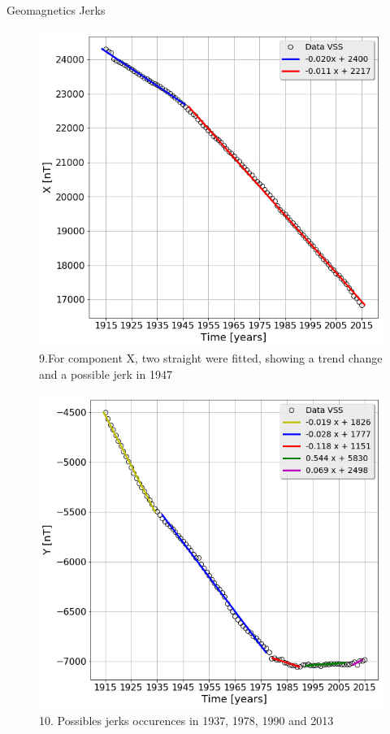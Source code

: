 \documentclass[final,t]{beamer}
\begin{document}
\begin{columns}[t]
\begin{column}{.25\linewidth}
\begin{block}{Geomagnetics Jerks}
		\centering
		\begin{figure}
			\centering
			\includegraphics[scale=0.8]{"figs_ed/Linear regression X_v3"}
			\caption{9.For component X, two straight were fitted, showing a trend change and a possible jerk in 1947}
			\label{fig:LinearregressionX_v2}
		\end{figure}
		
		
		\begin{figure}
			\centering
			\includegraphics[scale=0.8]{"figs_ed/Linear regression Y_v3"}
			\caption{10. Possibles jerks occurences in 1937, 1978, 1990 and 2013}
			\label{fintetico}
		\end{figure}	
		

\end{block}
\end{column}
\end{columns}
\end{document}
